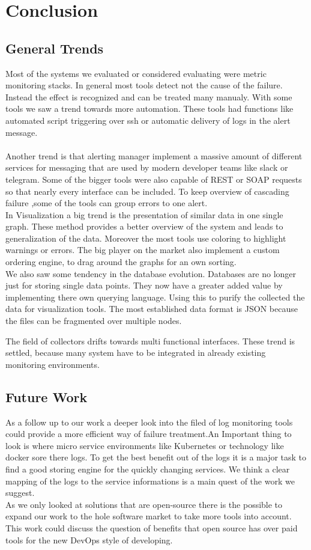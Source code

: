 
\chapter{Conclusion}\label{chap:conclusion}
\section{General Trends}
Most of the systems we evaluated or considered evaluating were metric monitoring stacks. In general most tools detect not the cause of the failure. Instead the effect is recognized and can be treated many manualy. With some tools we saw a trend towards more automation. These tools had functions like automated script triggering over ssh or automatic delivery of logs in the alert message. \\
\\
Another trend is that alerting manager implement a massive amount of different services for messaging that are used by modern developer teams like slack or telegram. Some of the bigger tools were also capable of REST or SOAP requests so that nearly every interface can be included. To keep overview of cascading failure ,some of the tools can group errors to one alert.
\\
In Visualization a big trend is the presentation of similar data in one single graph. These method provides a better overview of the system and leads to generalization of the data. Moreover the most tools use coloring to highlight warnings or errors. The big player on the market also implement a custom ordering engine, to drag around the graphs for an own sorting.
\\
We also saw some tendency in the database evolution. Databases are no longer just for storing single data points. They now have a greater added value by implementing there own querying language. Using this to purify the collected the data for visualization tools. The most established data format is JSON because the files can be fragmented over multiple nodes.

The field of collectors drifts towards multi functional interfaces. These trend is settled, because many system have to be integrated in already existing monitoring environments. 
\section*{Future Work}
As a follow up to our work a deeper look into the filed of log monitoring tools could provide a more efficient way of failure treatment.An Important thing to look is where micro service environments like Kubernetes or technology like docker sore there logs. To get the best benefit out of the logs it is a major task to find a good storing engine for the quickly changing services. We think a clear mapping of the logs to the service informations is a main quest of the work we suggest.\\
As we only looked at solutions that are open-source there is the possible to expand our work to the hole software market to take more tools into account. This work could discuss the question of benefits that open source has over paid tools for the new DevOps style of developing.

